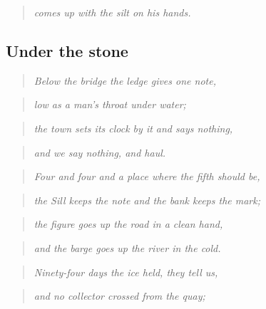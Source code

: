 \documentclass{design/chronicle}
\begin{document}
\begin{quote}\itshape comes up with the silt on his hands.\end{quote}

\subsection*{Under the stone}

\begin{quote}\itshape Below the bridge the ledge gives one note,\end{quote}

\begin{quote}\itshape low as a man’s throat under water;\end{quote}

\begin{quote}\itshape the town sets its clock by it and says nothing,\end{quote}

\begin{quote}\itshape and we say nothing, and haul.\end{quote}

\begin{quote}\itshape \end{quote}

\begin{quote}\itshape Four and four and a place where the fifth should be,\end{quote}

\begin{quote}\itshape the Sill keeps the note and the bank keeps the mark;\end{quote}

\begin{quote}\itshape the figure goes up the road in a clean hand,\end{quote}

\begin{quote}\itshape and the barge goes up the river in the cold.\end{quote}

\begin{quote}\itshape \end{quote}

\begin{quote}\itshape Ninety-four days the ice held, they tell us,\end{quote}

\begin{quote}\itshape and no collector crossed from the quay;\end{quote}
\end{document}
